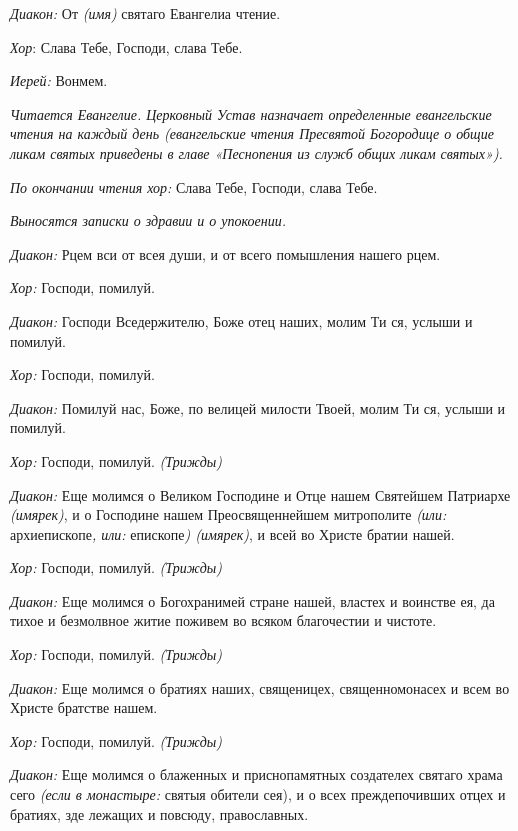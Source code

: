 \begin{mymulticols}
{\itshape Диакон:} От {\itshape (имя)} святаго Евангелиа чтение.


{\itshape Хор}: Слава Тебе, Господи, слава Тебе.


{\itshape Иерей:} Вонмем.




{\itshape Читается Евангелие. Церковный Устав назначает определенные евангельские чтения на каждый день (евангельские чтения Пресвятой Богородице о общие ликам святых приведены в главе «Песнопения из служб общих ликам святых»).}


{\itshape По окончании чтения хор:} Слава Тебе, Господи, слава Тебе.


{\itshape Выносятся записки о здравии и о упокоении.}




{\itshape Диакон:} Рцем вси от всея души, и от всего помышления нашего рцем.


{\itshape Хор:} Господи, помилуй.
 
{\itshape Диакон:} Господи Вседержителю, Боже отец наших, молим Ти ся, услыши и помилуй.


{\itshape Хор:} Господи, помилуй.

{\itshape Диакон:} Помилуй нас, Боже, по велицей милости Твоей, молим Ти ся, услыши и помилуй.


{\itshape Хор:} Господи, помилуй. {\itshape (Трижды)} 


{\itshape Диакон:} Еще молимся о Великом Господине и Отце нашем Святейшем Патриархе {\itshape (имярек)}, и о Господине нашем Преосвященнейшем митрополите {\itshape (или:} архиепископе{\itshape , или:} епископе{\itshape ) (имярек)}, и всей во Христе братии нашей. 

{\itshape Хор:} Господи, помилуй. {\itshape (Трижды)} 

{\itshape Диакон:} Еще молимся о Богохранимей стране нашей, властех и воинстве ея, да тихое и безмолвное житие поживем во всяком благочестии и чистоте. 

{\itshape Хор:} Господи, помилуй. {\itshape (Трижды)} 

{\itshape Диакон:} Еще молимся о братиях наших, священицех, священномонасех и всем во Христе братстве нашем.

{\itshape Хор:} Господи, помилуй. {\itshape (Трижды)} 

{\itshape Диакон:} Еще молимся о блаженных и приснопамятных создателех святаго храма сего {\itshape (если в монастыре:} святыя обители сея), и о всех преждепочивших отцех и братиях, зде лежащих и повсюду, православных. 


\end{mymulticols}
